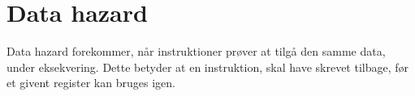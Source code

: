 \section{Data hazard}
Data hazard forekommer, når instruktioner prøver at tilgå den samme data, under eksekvering.
Dette betyder at en instruktion, skal have skrevet tilbage, før et givent register kan bruges igen.
